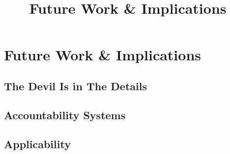\documentclass[../../main/main.tex]{subfiles}
\begin{document}
\title{Future Work \& Implications}


\chapter{Future Work \& Implications}\label{chp:future}

\section{The Devil Is in The Details}\label{sec:devil}

\section{Accountability Systems}\label{sec:accountability}

\section{Applicability }\label{sec:applicability }
\end{document}

